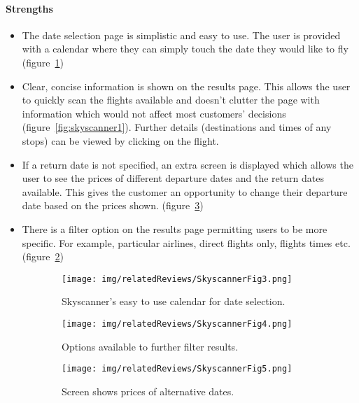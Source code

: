 \paragraph{Strengths}
\begin{itemize}
	\item The date selection page is simplistic and easy to use. The user is
		provided with a calendar where they can simply touch the date they
		would like to fly (figure~\ref{fig:skyscannerfig3})
	\item Clear, concise information is shown on the results page. This allows
		the user to quickly scan the flights available and doesn't clutter the
		page with information which would not affect most customers' decisions
		(figure~\ref{fig:skyscanner1}). Further details (destinations and times
		of any stops) can be viewed by clicking on the flight.
	\item If a return date is not specified, an extra screen is displayed which
		allows the user to see the prices of different departure dates and the
		return dates available. This gives the customer an opportunity to
		change their departure date based on the prices shown.
		(figure~\ref{fig:skyscannerfig5})
	\item There is a filter option on the results page permitting users to be
		more specific. For example, particular airlines, direct flights only,
		flights times etc. (figure~\ref{fig:skyscannerfig4})
\end{itemize}
\begin{figure}[ht]
	\centering
	\begin{subfigure}[b]{0.2\textwidth}
		\texttt{[image: img/relatedReviews/SkyscannerFig3.png]}
		\caption{Skyscanner's easy to use calendar for date selection.
		}\label{fig:skyscannerfig3}
	\end{subfigure}
	\qquad
	\begin{subfigure}[b]{0.2\textwidth}
		\texttt{[image: img/relatedReviews/SkyscannerFig4.png]}
		\caption{Options available to further filter results.
		}\label{fig:skyscannerfig4}
	\end{subfigure}
	\qquad
	\begin{subfigure}[b]{0.2\textwidth}
		\texttt{[image: img/relatedReviews/SkyscannerFig5.png]}
		\caption{Screen shows prices of alternative dates.
		}\label{fig:skyscannerfig5}
	\end{subfigure}
	\caption{}\label{fig:skyscanner2}
\end{figure}

